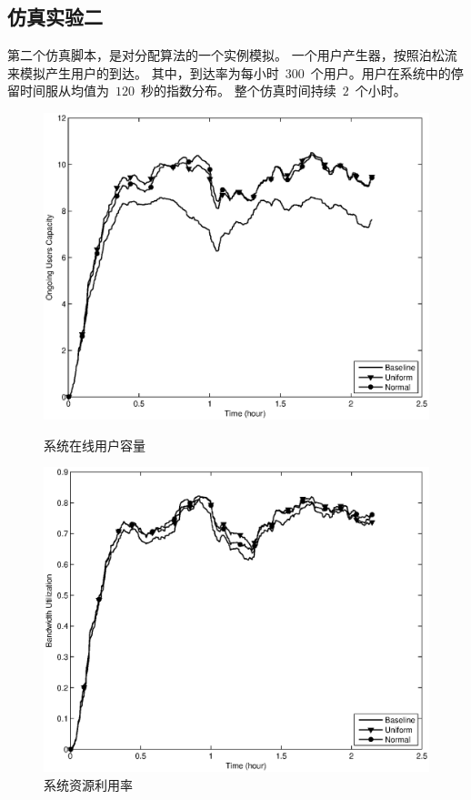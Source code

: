 \subsection{仿真实验二}
第二个仿真脚本，是对分配算法的一个实例模拟。
一个用户产生器，按照泊松流来模拟产生用户的到达。
其中，到达率为每小时~$300$~个用户。用户在系统中的停留时间服从均值为~$120$~秒的指数分布。
整个仿真时间持续~$2$~个小时。
\begin{figure}[htbp] 
   \centering
  \begin{minipage}[t]{0.65\linewidth} 
    \centering 
    \includegraphics[width=\textwidth]{bayesian_time_vs_ongoing_user_number.eps} 
    \caption{系统在线用户容量} 
    \label{fig:chap_bayesian:time_vs_ongoing_user_number} 
  \end{minipage} 

  \centering
  \begin{minipage}[t]{0.65\linewidth} 
    \centering 
    \includegraphics[width=\textwidth]{bayesian_time_vs_bw_utilization.eps} 
    \caption{系统资源利用率} 
    \label{fig:chap_bayesian:time_vs_bw_utilization} 
  \end{minipage} 
\end{figure}
